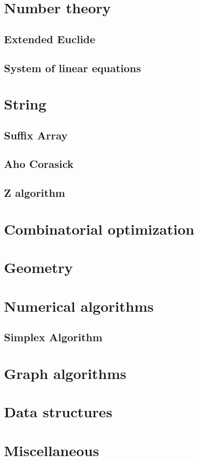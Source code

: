 \section{Number theory}
\subsection{Extended Euclide}
\raggedbottom
\hrulefill
\subsection{System of linear equations}
\raggedbottom
\hrulefill

\section{String}
\subsection{Suffix Array}
\raggedbottom
\hrulefill
\subsection{Aho Corasick}
\raggedbottom
\hrulefill
\subsection{Z algorithm}
\raggedbottom
\hrulefill

\section{Combinatorial optimization}

\section{Geometry}

\section{Numerical algorithms}
\subsection{Simplex Algorithm}
\raggedbottom
\hrulefill

\section{Graph algorithms}

\section{Data structures}

\section{Miscellaneous}

